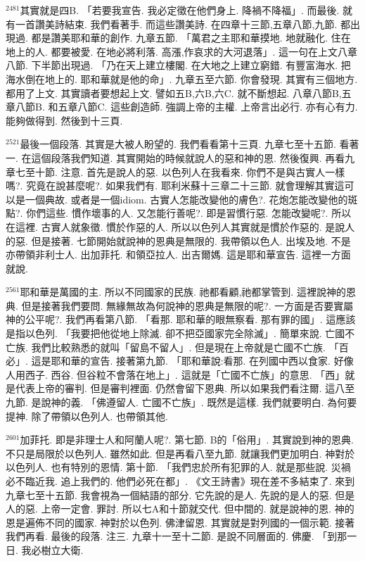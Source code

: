 \documentclass{book}
\begin{document}
$^{2481}$其實就是四B.
「若要我宣告.
我必定徵在他們身上.
降禍不降福」.
而最後.
就有一首讚美詩結束.
我們看著手.
而這些讚美詩.
在四章十三節,五章八節,九節.
都出現過.
都是讚美耶和華的創作.
九章五節.
「萬君之主耶和華摸地.
地就融化.
住在地上的人.
都要被愛.
在地必將利落.
高漲,作哀求的大河退落」.
這一句在上文八章八節.
下半節出現過.
「乃在天上建立樓閣.
在大地之上建立窮錯.
有豐富海水.
把海水倒在地上的.
耶和華就是他的命」.
九章五至六節.
你會發現.
其實有三個地方.
都用了上文.
其實讀者要想起上文.
譬如五B,六B,六C.
就不斷想起.
八章八節B,五章八節B.
和五章八節C.
這些創造師.
強調上帝的主權.
上帝言出必行.
亦有心有力.
能夠做得到.
然後到十三頁.

$^{2521}$最後一個段落.
其實是大被人盼望的.
我們看看第十三頁.
九章七至十五節.
看著一.
在這個段落我們知道.
其實開始的時候就說人的惡和神的恩.
然後復興.
再看九章七至十節.
注意.
首先是說人的惡.
以色列人在我看來.
你們不是與古實人一樣嗎?.
究竟在說甚麼呢?.
如果我們有.
耶利米蘇十三章二十三節.
就會理解其實這可以是一個典故.
或者是一個idiom.
古實人怎能改變他的膚色?.
花炮怎能改變他的斑點?.
你們這些.
慣作壞事的人.
又怎能行善呢?.
即是習慣行惡.
怎能改變呢?.
所以在這裡.
古實人就象徵.
慣於作惡的人.
所以以色列人其實就是慣於作惡的.
是說人的惡.
但是接著.
七節開始就說神的恩典是無限的.
我帶領以色人.
出埃及地.
不是亦帶領非利士人.
出加菲托.
和領亞拉人.
出吉爾媽.
這是耶和華宣告.
這裡一方面就說.

$^{2561}$耶和華是萬國的主.
所以不同國家的民族.
祂都看顧,祂都掌管到.
這裡說神的恩典.
但是接著我們要問.
無緣無故為何說神的恩典是無限的呢?.
一方面是否要實屬神的公平呢?.
我們再看第八節.
「看那.
耶和華的眼無察看.
那有罪的國」.
這應該是指以色列.
「我要把他從地上除滅.
卻不把亞國家完全除滅」.
簡單來說.
亡國不亡族.
我們比較熟悉的就叫「留島不留人」.
但是現在上帝就是亡國不亡族.
「百必」.
這是耶和華的宣告.
接著第九節.
「耶和華說:看那.
在列國中西以食家.
好像人用西子.
西谷.
但谷粒不會落在地上」.
這就是「亡國不亡族」的意思.
「西」就是代表上帝的審判.
但是審判裡面.
仍然會留下恩典.
所以如果我們看注爾.
這八至九節.
是說神的義.
「佛遵留人.
亡國不亡族」.
既然是這樣.
我們就要明白.
為何要提神.
除了帶領以色列人.
也帶領其他.

$^{2601}$加菲托.
即是非理士人和阿蘭人呢?.
第七節.
B的「俗用」.
其實說到神的恩典.
不只是局限於以色列人.
雖然如此.
但是再看八至九節.
就讓我們更加明白.
神對於以色列人.
也有特別的恩情.
第十節.
「我們忠於所有犯罪的人.
就是那些說.
災禍必不臨近我.
追上我們的.
他們必死在都」.
《文王詩書》現在差不多結束了.
來到九章七至十五節.
我會視為一個結語的部分.
它先說的是人.
先說的是人的惡.
但是人的惡.
上帝一定會.
罪討.
所以七A和十節就交代.
但中間的.
就是說神的恩.
神的恩是遍佈不同的國家.
神對於以色列.
佛津留恩.
其實就是對列國的一個示範.
接著我們再看.
最後的段落.
注三.
九章十一至十二節.
是說不同層面的.
佛慶.
「到那一日.
我必樹立大衛.
\end{document}
